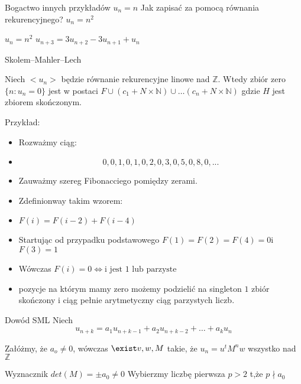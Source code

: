 \documentclass{beamer}
\theoremstyle{definition}
\begin{document}
\begin{frame}{Bogactwo innych przykładów}
    $u_n = n$
    Jak zapisać za pomocą równania rekurencyjnego? 
    $u_n = n^{2}$
\end{frame}

\begin{frame}{$u_n = n^{2}$}
    $u_{n+3} = 3 u_{n+2} - 3 u_{n+1} + u_{n} $
\end{frame}

\begin{frame}{Skolem–Mahler–Lech }
\begin{theorem}
    Niech $<u_n>$ będzie równanie rekurencyjne linowe nad $\mathbb{Z}$. Wtedy zbiór zero $\{ n: u_n =0\}$ jest w postaci $F \cup (c_1 + N\times \mathbb{N}) \cup \ldots (c_n + N\times \mathbb{N}) $ gdzie $H$ jest zbiorem skończonym.  
\end{theorem}
\end{frame}

\begin{frame}{Przykład:}
\begin{itemize}
   \item  Rozważmy ciąg: 
   \item  $$ 0, 0, 1, 0, 1, 0, 2, 0, 3, 0, 5, 0, 8, 0, ...$$
    \item      Zauważmy szereg Fibonacciego pomiędzy zerami. 
    \item  Zdefinionway takim wzorem:
    \item  $F(i) = F(i-2) + F(i-4)$
    \item  Startując od przypadku podstawowego $F(1) = F(2) = F(4) = 0$i $F(3) = 1$
    \item  Wówczas $F(i) = 0 \iff \text{i jest 1 lub parzyste} $  
    \item pozycje na którym mamy zero możemy podzielić na singleton ${1}$ zbiór skończony i ciąg pełnie arytmetyczny ciąg parzystych liczb. 
\end{itemize}
\end{frame}

\begin{frame}{Dowód  SML}
    Niech $$u_{n+k}=a_{1} u_{n+k-1}+a_{2} u_{n+k-2}+\ldots+a_{k} u_{n}$$
    
    Załóżmy, że $a_o \neq 0$, wówczas $\exist v, w, M$ takie, że 
    $u_n = u^{t} M^{n} w $ wszystko nad $\mathbb{Z}$
    
    Wyznacznik $det(M) = \pm a_0 \neq 0$
    Wybierzmy liczbę pierwsza $p > 2$ t,że $p \nmid a_0$
\end{frame}
\end{document}
